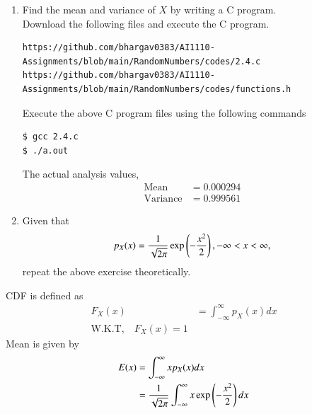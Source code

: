 \documentclass[journal,12pt,twocolumn]{IEEEtran}
\renewcommand\thesection{\arabic{section}}
\begin{document}
\begin{enumerate}[label=\thesection.\arabic*
,ref=\thesection.\theenumi]
\begin{align}
    \displaystyle{Q(x)} &= Pr\brak{X>x} \\
                        &= 1 - Pr\brak{X \leq x }\\
                        &= 1 - F_X(x)
\end{align}

\item Find the mean and variance of $X$ by writing a C program.\\
\solution Download the following files and execute the  C program.
\begin{lstlisting}
https://github.com/bhargav0383/AI1110-Assignments/blob/main/RandomNumbers/codes/2.4.c
https://github.com/bhargav0383/AI1110-Assignments/blob/main/RandomNumbers/codes/functions.h
\end{lstlisting}
Execute the above C program files using the following commands
\begin{lstlisting}
$ gcc 2.4.c
$ ./a.out
\end{lstlisting}
The actual analysis values,
\begin{align}
    \text{Mean}&= 0.000294 \\
    \text{Variance} &= 0.999561
\end{align}
\item Given that 
\begin{align}
p_{X}(x) = \frac{1}{\sqrt{2\pi}}\exp\left(-\frac{x^2}{2}\right), -\infty < x < \infty,
\end{align}
repeat the above exercise theoretically.
\end{enumerate}
\solution 
CDF is defined as
    \begin{align}
        F_X(x)&=\int_{-\infty}^{\infty}p_X(x)dx\\
        \text{W.K.T,} \quad \boxed{F_X(x)=1}
    \end{align}
Mean is given by
    \begin{align}
        E(x)&=\int_{-\infty}^{\infty}xp_X(x)dx\\\
            &=\frac{1}{\sqrt{2\pi}}\int_{-\infty}^{\infty}x\exp\left(-\frac{x^2}{2}\right)dx
    \end{align}
\end{document}
